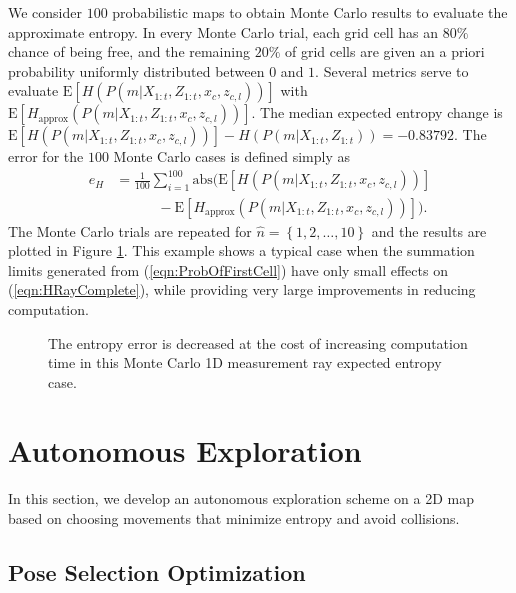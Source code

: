 \documentclass[letterpaper, 10pt]{ieeeconf}
\newcommand{\braces}[1]{\ensuremath{\left\{ #1 \right\}}}
\newcommand{\refeqn}[1]{(\ref{eqn:#1})}
\begin{document}
We consider $100$ probabilistic maps to obtain Monte Carlo results to evaluate the approximate entropy. In every Monte Carlo trial, each grid cell has an $80\%$ chance of being free, and the remaining $20\%$ of grid cells are given an a priori probability uniformly distributed between $0$ and $1$. 
Several metrics serve to evaluate $\text{E}[H(P(m|X_{1:t},Z_{1:t},x_c,z_{c,l}))]$ with $\text{E}[H_\text{approx}(P(m|X_{1:t},Z_{1:t},x_c,z_{c,l}))]$. The median expected entropy change is $\text{E}[H(P(m|X_{1:t},Z_{1:t},x_c,z_{c,l}))]-H(P(m|X_{1:t},Z_{1:t}))=-0.83792$. The error for the $100$ Monte Carlo cases is defined simply as
\begin{align}
e_{H}&=\frac1{100}\sum_{i=1}^{100}\text{abs}\bigg(\text{E}[H(P(m|X_{1:t},Z_{1:t},x_c,z_{c,l}))]\nonumber\\&\qquad\quad-\text{E}[H_\text{approx}(P(m|X_{1:t},Z_{1:t},x_c,z_{c,l}))]\bigg).
\end{align}
The Monte Carlo trials are repeated for $\hat n=\braces{1,2,\ldots,10}$ and the results are plotted in Figure \ref{fig:ApproxJust}.
This example shows a typical case when the summation limits generated from \refeqn{ProbOfFirstCell} have only small effects on \refeqn{HRayComplete}, while providing very large improvements in reducing computation.

\begin{figure}
\centerline{
}
\caption{The entropy error is decreased at the cost of increasing computation time in this Monte Carlo 1D measurement ray expected entropy case.}
\label{fig:ApproxJust}
\end{figure}



\section{Autonomous Exploration}

In this section, we develop an autonomous exploration scheme on a 2D map based on choosing movements that minimize entropy and avoid collisions.

\subsection{Pose Selection Optimization}
\end{document}
